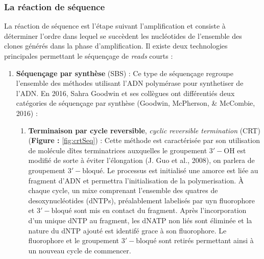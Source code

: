 \documentclass[12pt,twoside]{reedthesis}
\providecommand{\tightlist}{%
  \setlength{\itemsep}{0pt}\setlength{\parskip}{0pt}}
\theoremstyle{definition}
\theoremstyle{definition}
\theoremstyle{remark}
\begin{document}
  \subsubsection{La réaction de séquence}\label{la-reaction-de-sequence}
  
  La réaction de séquence est l'étape suivant l'amplification et consiste
  à déterminer l'ordre dans lequel se succèdent les nucléotides de
  l'ensemble des clones générés dans la phase d'amplification. Il existe
  deux technologies principales permettant le séquençage de \emph{reads}
  courts :\\
  
  \begin{enumerate}
  \def\labelenumi{\arabic{enumi}.}
  \tightlist
  \item
    \textbf{Séquençage par synthèse} (SBS) : Ce type de séquençage
    regroupe l'ensemble des méthodes utilisant l'ADN polymérase pour
    synthetiser de l'ADN. En 2016, Sahra Goodwin et ses collègues ont
    différentiés deux catégories de séquençage par synthèse (Goodwin,
    McPherson, \& McCombie, 2016) :
  
    \begin{enumerate}
    \def\labelenumii{\alph{enumii}.}
    \tightlist
    \item
      \textbf{Terminaison par cycle reversible}, \emph{cyclic reversible
      termination} (CRT) (\textbf{Figure : }\ref{fig:crtSeq}) : Cette
      méthode est caractérisée par son utilisation de molécule dîtes
      terminatrices auxquelles le groupement \(\mathrm{3'-OH}\) est
      modifié de sorte à éviter l'élongation (J. Guo et al., 2008), on
      parlera de groupement \(\mathrm{3'-bloqué}\). Le processus est
      initialisé une amorce est liée au fragment d'ADN et permettra
      l'initialisation de la polymerisation. À chaque cycle, un mixe
      comprenant l'ensemble des quatres de desoxynucléotides (dNTPs),
      préalablement labelisés par uyn fluorophore et
      \(\mathrm{3'-bloqué}\) sont mis en contact du fragment. Après
      l'incorporation d'un unique dNTP au fragment, les dNATP non liés
      sont éliminée et la nature du dNTP ajouté est identifé grace à son
      fluorophore. Le fluorophore et le groupement \(\mathrm{3'-bloqué}\)
      sont retirés permettant ainsi à un nouveau cycle de commencer.
    \end{enumerate}
  \end{enumerate}
  
\end{document}

